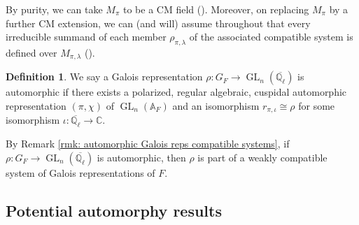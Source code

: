 \documentclass{amsart}
\theoremstyle{definition}
\newtheorem{definition}[theorem]{Definition}
\numberwithin{equation}{section} %
\newcommand{\GL}{\operatorname{GL}}
\newcommand{\Qlbar}{\ensuremath{\overline{\mathbb{Q}_\ell}}}
\newcommand{\bb}[1]{\mathbb{#1}}
\begin{document}
By purity, we can take $M_\pi$ to be a CM field (\cite[Lemma 1.2]{PatTay15}).
Moreover, on replacing $M_\pi$ by a further CM extension, we can (and will) assume throughout that every irreducible summand of each member $\rho_{\pi,\lambda}$ of the associated compatible system is defined over $M_{\pi,\lambda}$ (\cite[Lemma 1.4]{PatTay15}).

\begin{definition} \label{defn: automorphic Galois representation}
We say a Galois representation $\rho: G_F \to \GL_n(\Qlbar)$ is automorphic if there exists a polarized, regular algebraic, cuspidal automorphic representation $(\pi,\chi)$ of \( \GL_n(\bb{A}_{F}) \) and an isomorphism $r_{\pi,\iota} \cong \rho$ for some isomorphism $\iota: \Qlbar \to \mathbb{C}$.
\end{definition}

By Remark \ref{rmk: automorphic Galois reps compatible systems}, if $\rho: G_F \to \GL_n(\Qlbar)$ is automorphic, then $\rho$ is part of a weakly compatible system of Galois representations of $F$.

\subsection{Potential automorphy results}
\end{document}
